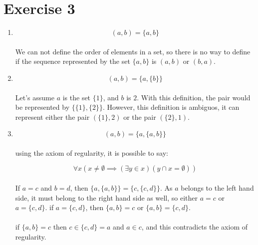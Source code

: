 \documentclass{article}
\begin{document}
\section*{Exercise 3}
\begin{enumerate}[label=\alph*.]
  \item
        \[
          (a,b) = \{a,b\}
        \]
        \paragraph{}
        We can not define the order of elements in a set, so there is no way to define if the sequence represented
        by the set $\{a,b\}$ is $(a,b)$ or $(b,a)$.
  \item
        \[
          (a,b) = \{a,\{b\}\}
        \]
        \paragraph{}
        Let's assume $a$ is the set $\{1\}$, and $b$ is $2$. With this definition, the pair would be
        represented by $\{\{1\},\{2\}\}$. However, this definition is ambiguos, it can represent either
        the pair $(\{1\},2)$ or the pair $(\{2\},1)$.
  \item
        \[
          (a,b) = \{a,\{a,b\}\}
        \]
        \paragraph{}
        using the axiom of regularity, it is possible to say:


        \[
          \forall x (x \neq \emptyset \implies (\exists y \in x)(y \cap x = \emptyset))
        \]

        \paragraph{}
        If $a = c$ and $b = d$, then $\{a,\{a,b\}\} = \{c,\{c,d\}\}$. As $a$ belongs to the left hand side,
        it must belong to the right hand side as well, so either $a = c$ or $a = \{c, d\}$.
        if $a = \{c, d\}$, then $\{a, b\} = c$ or $\{a, b\} = \{c, d\}$.

        \paragraph{}
        if $\{a, b\} = c$ then $c \in \{c,d\} = a$ and $a \in c$, and this contradicts the axiom of
        regularity.


\end{enumerate}
\end{document}
